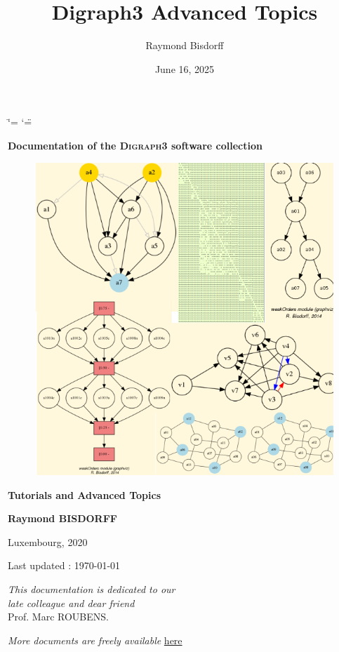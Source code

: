 \documentclass[a4paper,12pt,english]{sphinxhowto}
\title{Digraph3 Advanced Topics}
\date{June 16, 2025}
\author{Raymond Bisdorff}
\begin{document}
\ifdefined\shorthandoff
  \ifnum\catcode`\=\string=\active\shorthandoff{=}\fi
  \ifnum\catcode`\"=\active{}\fi
\fi

\pagestyle{empty}


    \begin{titlepage}
        \centering

        \vspace*{10mm} %
        \textbf{\Large {Documentation of the \textsc{Digraph3} software collection}}

        \vspace{5mm}
        \begin{figure}[!h]
            \centering
            \includegraphics[scale=0.5]{introDoc3.png}
        \end{figure}

        \vspace{10mm}
        \textbf{\Huge {Tutorials and Advanced Topics}}

        \textbf{Raymond BISDORFF}

        \small Luxembourg,  2020

        \small  Last updated : \today
        
        \vspace{10mm}
        \begin{center}
        \emph{This documentation is dedicated to our}\\
        \emph{late colleague and dear friend}\\
         Prof. Marc ROUBENS.
        \end{center}

        \vfill
        \textit{More documents are freely available }{\href{https://digraph3.readthedocs.io/en/latest}{here}}
    \end{titlepage}
\end{document}
